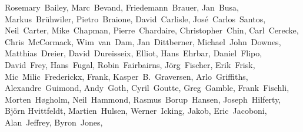 { \flushleft\small
Rosemary~Bailey,           %
Marc~Bevand,               %
Friedemann~Brauer,         %
Jan~Busa,                  %
Markus~Br\"uhwiler,        %
Pietro~Braione,            %
David~Carlisle,            %
Jos\'e~Carlos~Santos,      %
Neil~Carter,               %
Mike~Chapman,              %
Pierre~Chardaire,          %
Christopher~Chin,          %
Carl~Cerecke,              %
Chris~McCormack,           %
Wim~van~Dam,               %
Jan~Dittberner,            %
Michael~John~Downes,       %
Matthias~Dreier,           %
David~Dureisseix,          %
Elliot,                    %
Hans~Ehrbar,               %
Daniel~Flipo,              %
David~Frey,                %
Hans~Fugal,                %
Robin~Fairbairns,          %
J\"org~Fischer,            %
Erik~Frisk,                %
Mic~Milic~Frederickx,      %
Frank,                     %
Kasper~B.~Graversen,       %
Arlo~Griffiths,            %
Alexandre~Guimond,         %
Andy~Goth,                 %
Cyril~Goutte,              %
Greg~Gamble,               %
Frank~Fischli,             %
Morten~Høgholm,		       %
Neil~Hammond,              %
Rasmus~Borup~Hansen,       %
Joseph~Hilferty,           %
Bj\"orn Hvittfeldt,        %
Martien~Hulsen,            %
Werner~Icking,             %
Jakob,                     %
Eric~Jacoboni,             %
Alan~Jeffrey,              %
Byron~Jones,               %
}
